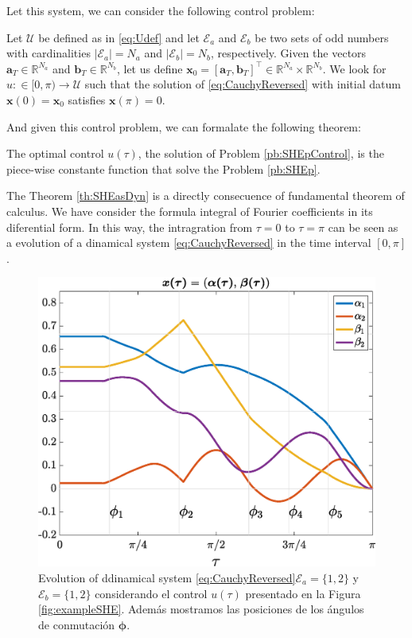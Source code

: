 %
Let this system, we can consider the following control problem:
\vspace{1em}
\begin{problem}\label{pb:SHEpControl}
    Let $\mathcal{U}$ be defined as in \eqref{eq:Udef} and let $\mathcal{E} _a $ and $\mathcal{E} _b $ be two sets of odd numbers with cardinalities $|\mathcal{E}_a| = N_a $ and $ |\mathcal{E} _b| = N_b$, respectively. Given the vectors $\bm{a}_T \in \mathbb{R}^{N_a}$ and $\bm{b}_T \in \mathbb{R}^{N_b} $, let us define $\bm{x}_0=[\bm{a}_T,\bm{b}_T]^\top \in \mathbb{R}^{N_a}\times\mathbb{R}^{N_b}$. We look for $u:\in [0,\pi)\to\mathcal{U}$ such that the solution of \eqref{eq:CauchyReversed} with initial datum $\bm{x}(0)=\bm{x}_0$ satisfies $\bm{x}(\pi)=0$.
\end{problem}
And given this control problem, we can formalate the following theorem:
\vspace{1em}
\begin{theorem}\label{th:SHEasDyn}
    The optimal control $u(\tau)$, the solution of Problem \ref{pb:SHEpControl}, is the piece-wise constante function that solve the Problem \ref{pb:SHEp}.
\end{theorem}

The Theorem \ref{th:SHEasDyn} is a directly consecuence of fundamental theorem of calculus. We have consider the formula integral of Fourier coefficients in its diferential form. In this way, the intragration from $\tau = 0$ to $\tau = \pi$ can be seen as a evolution of a dinamical system \eqref{eq:CauchyReversed} in the time interval $[0,\pi]$.

\begin{figure}[ht!] 
    \centering
    \includegraphics[scale=0.325]{img/fig02.eps}
    \caption{Evolution of ddinamical system \eqref{eq:CauchyReversed}$\mathcal{E}_a = \{1,2\}$ y $\mathcal{E}_b = \{1,2\}$ considerando el control $u(\tau)$ presentado en la Figura \ref{fig:exampleSHE}. Además mostramos las posiciones de los ángulos de conmutación $\bm{\phi}$.}
\end{figure}

